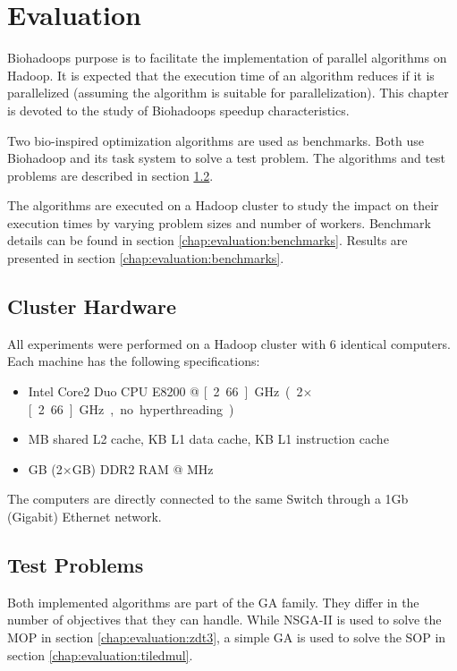 \chapter{Evaluation}
\label{chap:evaluation}
Biohadoops purpose is to facilitate the implementation of parallel algorithms on Hadoop. It is expected that the execution time of an algorithm reduces if it is parallelized (assuming the algorithm is suitable for parallelization). This chapter is devoted to the study of Biohadoops speedup characteristics.

Two bio-inspired optimization algorithms are used as benchmarks. Both use Biohadoop and its task system to solve a test problem. The algorithms and test problems are described in section \ref{chap:evaluation:testproblems}.

The algorithms are executed on a Hadoop cluster to study the impact on their execution times by varying problem sizes and number of workers. Benchmark details can be found in section \ref{chap:evaluation:benchmarks}. Results are presented in section \ref{chap:evaluation:benchmarks}.

\section{Cluster Hardware}
All experiments were performed on a Hadoop cluster with 6 identical computers. Each machine has the following specifications:

\begin{itemize}
  \item Intel Core2 Duo CPU E8200 @ \unit[2.66]{GHz} (2$\times$\unit[2.66]{GHz}, no hyperthreading)
  \item \unit[6]{MB} shared L2 cache, \unit[32]{KB} L1 data cache, \unit[32]{KB} L1 instruction cache
  \item \unit[4]{GB} (2$\times$\unit[2]{GB}) DDR2 RAM @ \unit[667]{MHz}
\end{itemize}

The computers are directly connected to the same Switch through a 1Gb (Gigabit) Ethernet network.

\section{Test Problems}
\label{chap:evaluation:testproblems}
Both implemented algorithms are part of the GA family. They differ in the number of objectives that they can handle. While NSGA-II is used to solve the MOP in section \ref{chap:evaluation:zdt3}, a simple GA is used to solve the SOP in section \ref{chap:evaluation:tiledmul}.

